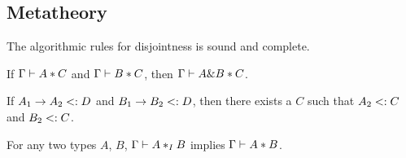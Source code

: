 \subsection{Metatheory}

The algorithmic rules for disjointness is sound and complete.

\begin{theorem} \label{disjoint-intersect}
  If $\Gamma \vdash A * C$ and $\Gamma \vdash B * C$,
  then $\Gamma \vdash A \& B * C$.
\end{theorem}

\begin{lemma} \label{common-supertype}
  If $A_1 \to A_2 <: D$ and $B_1 \to B_2 <: D$,
  then there exists a $C$ such that $A_2 <: C$ and $B_2 <: C$.
\end{lemma}

\begin{theorem}[Soundness]
  For any two types $A$, $B$, $\Gamma \vdash A *_I B$ implies $\Gamma \vdash A * B$.
\end{theorem}
